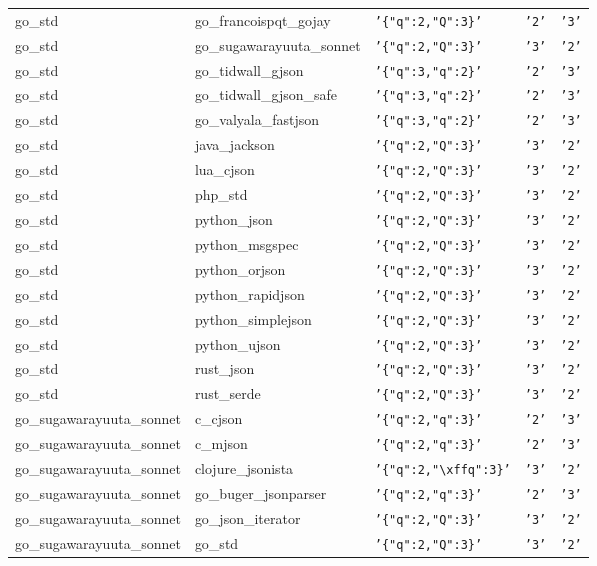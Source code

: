 \documentclass[english, 12pt, a4paper, sci, utf8, a-2b, online]{aaltothesis}
\def\str#1{\texttt{'#1'}}
\begin{document}
\begin{longtable}{lllll}
    go\_std & go\_francoispqt\_gojay & \str{\{"q":2,"Q":3\}} & \str{2} & \str{3} \\
    go\_std & go\_sugawarayuuta\_sonnet & \str{\{"q":2,"Q":3\}} & \str{3} & \str{2} \\
    go\_std & go\_tidwall\_gjson & \str{\{"q":3,"q":2\}} & \str{2} & \str{3} \\
    go\_std & go\_tidwall\_gjson\_safe & \str{\{"q":3,"q":2\}} & \str{2} & \str{3} \\
    go\_std & go\_valyala\_fastjson & \str{\{"q":3,"q":2\}} & \str{2} & \str{3} \\
    go\_std & java\_jackson & \str{\{"q":2,"Q":3\}} & \str{3} & \str{2} \\
    go\_std & lua\_cjson & \str{\{"q":2,"Q":3\}} & \str{3} & \str{2} \\
    go\_std & php\_std & \str{\{"q":2,"Q":3\}} & \str{3} & \str{2} \\
    go\_std & python\_json & \str{\{"q":2,"Q":3\}} & \str{3} & \str{2} \\
    go\_std & python\_msgspec & \str{\{"q":2,"Q":3\}} & \str{3} & \str{2} \\
    go\_std & python\_orjson & \str{\{"q":2,"Q":3\}} & \str{3} & \str{2} \\
    go\_std & python\_rapidjson & \str{\{"q":2,"Q":3\}} & \str{3} & \str{2} \\
    go\_std & python\_simplejson & \str{\{"q":2,"Q":3\}} & \str{3} & \str{2} \\
    go\_std & python\_ujson & \str{\{"q":2,"Q":3\}} & \str{3} & \str{2} \\
    go\_std & rust\_json & \str{\{"q":2,"Q":3\}} & \str{3} & \str{2} \\
    go\_std & rust\_serde & \str{\{"q":2,"Q":3\}} & \str{3} & \str{2} \\
    go\_sugawarayuuta\_sonnet & c\_cjson & \str{\{"q":2,"q":3\}} & \str{2} & \str{3} \\
    go\_sugawarayuuta\_sonnet & c\_mjson & \str{\{"q":2,"q":3\}} & \str{2} & \str{3} \\
    go\_sugawarayuuta\_sonnet & clojure\_jsonista & \str{\{"q":2,"\textbackslash xffq":3\}} & \str{3} & \str{2} \\
    go\_sugawarayuuta\_sonnet & go\_buger\_jsonparser & \str{\{"q":2,"q":3\}} & \str{2} & \str{3} \\
    go\_sugawarayuuta\_sonnet & go\_json\_iterator & \str{\{"q":2,"Q":3\}} & \str{3} & \str{2} \\
    go\_sugawarayuuta\_sonnet & go\_std & \str{\{"q":2,"Q":3\}} & \str{3} & \str{2} \\

\end{longtable}
\end{document}
